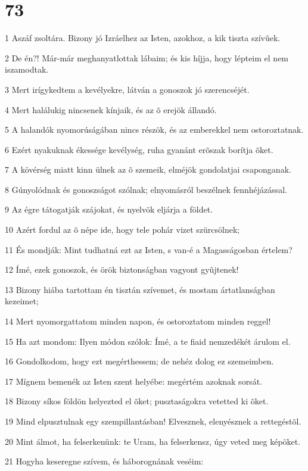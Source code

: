 \chapter{73}

\par 1 Aszáf zsoltára. Bizony jó Izráelhez az Isten, azokhoz, a kik tiszta szívûek.
\par 2 De én?! Már-már meghanyatlottak lábaim; és kis híjja, hogy lépteim el nem iszamodtak.
\par 3 Mert irígykedtem a kevélyekre, látván a gonoszok jó szerencséjét.
\par 4 Mert halálukig nincsenek kínjaik, és az õ erejök állandó.
\par 5 A halandók nyomorúságában nincs részök, és az emberekkel nem ostoroztatnak.
\par 6 Ezért nyakuknak ékessége kevélység, ruha gyanánt erõszak borítja õket.
\par 7 A kövérség miatt kinn ülnek az õ szemeik, elméjök gondolatjai csaponganak.
\par 8 Gúnyolódnak és gonoszságot szólnak; elnyomásról beszélnek fennhéjázással.
\par 9 Az égre tátogatják szájokat, és nyelvök eljárja a földet.
\par 10 Azért fordul az õ népe ide, hogy tele pohár vizet szürcsölnek;
\par 11 És mondják: Mint tudhatná ezt az Isten, s van-é a Magasságosban értelem?
\par 12 Ímé, ezek gonoszok, és örök biztonságban vagyont gyûjtenek!
\par 13 Bizony hiába tartottam én tisztán szívemet, és mostam ártatlanságban kezeimet;
\par 14 Mert nyomorgattatom minden napon, és ostoroztatom minden reggel!
\par 15 Ha azt mondom: Ilyen módon szólok: Ímé, a te fiaid nemzedékét árulom el.
\par 16 Gondolkodom, hogy ezt megérthessem; de nehéz dolog ez szemeimben.
\par 17 Mígnem bemenék az Isten szent helyébe: megértém azoknak sorsát.
\par 18 Bizony síkos földön helyezted el õket; pusztaságokra vetetted ki õket.
\par 19 Mind elpusztulnak egy szempillantásban! Elvesznek, elenyésznek a rettegéstõl.
\par 20 Mint álmot, ha felserkenünk: te Uram, ha felserkensz, úgy veted meg képöket.
\par 21 Hogyha keseregne szívem, és háborognának veséim:
